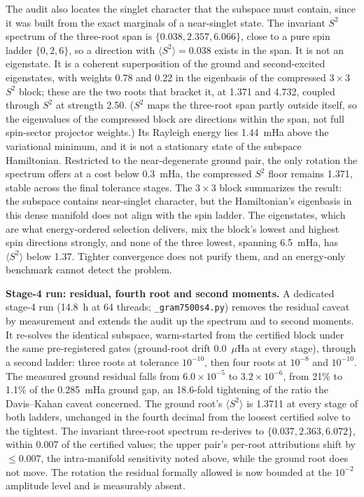 \documentclass[11pt]{article}
\newcommand{\ssq}{\ensuremath{\langle S^2\rangle}}
\begin{document}
The audit also locates the singlet character that the subspace must contain, since it was built from the exact marginals of a near-singlet state. The invariant $S^2$ spectrum of the three-root span is $\{0.038, 2.357, 6.066\}$, close to a pure spin ladder $\{0, 2, 6\}$, so a direction with $\ssq = 0.038$ exists in the span. It is not an eigenstate. It is a coherent superposition of the ground and second-excited eigenstates, with weights 0.78 and 0.22 in the eigenbasis of the compressed $3\times3$ $S^2$ block; these are the two roots that bracket it, at 1.371 and 4.732, coupled through $S^2$ at strength 2.50. ($S^2$ maps the three-root span partly outside itself, so the eigenvalues of the compressed block are directions within the span, not full spin-sector projector weights.) Its Rayleigh energy lies 1.44~mHa above the variational minimum, and it is not a stationary state of the subspace Hamiltonian. Restricted to the near-degenerate ground pair, the only rotation the spectrum offers at a cost below 0.3~mHa, the compressed $S^2$ floor remains 1.371, stable across the final tolerance stages. The $3\times3$ block summarizes the result: the subspace contains near-singlet character, but the Hamiltonian's eigenbasis in this dense manifold does not align with the spin ladder. The eigenstates, which are what energy-ordered selection delivers, mix the block's lowest and highest spin directions strongly, and none of the three lowest, spanning 6.5~mHa, has \ssq{} below 1.37. Tighter convergence does not purify them, and an energy-only benchmark cannot detect the problem.

\textbf{Stage-4 run: residual, fourth root and second moments.} A dedicated stage-4 run (14.8~h at 64 threads; \texttt{\_gram7500s4.py}) removes the residual caveat by measurement and extends the audit up the spectrum and to second moments. It re-solves the identical subspace, warm-started from the certified block under the same pre-registered gates (ground-root drift 0.0~$\mu$Ha at every stage), through a second ladder: three roots at tolerance $10^{-10}$, then four roots at $10^{-8}$ and $10^{-10}$. The measured ground residual falls from $6.0\times10^{-5}$ to $3.2\times10^{-6}$, from 21\% to 1.1\% of the 0.285~mHa ground gap, an 18.6-fold tightening of the ratio the Davis--Kahan caveat concerned. The ground root's \ssq{} is 1.3711 at every stage of both ladders, unchanged in the fourth decimal from the loosest certified solve to the tightest. The invariant three-root spectrum re-derives to $\{0.037, 2.363, 6.072\}$, within 0.007 of the certified values; the upper pair's per-root attributions shift by $\le0.007$, the intra-manifold sensitivity noted above, while the ground root does not move. The rotation the residual formally allowed is now bounded at the $10^{-2}$ amplitude level and is measurably absent.
\end{document}
